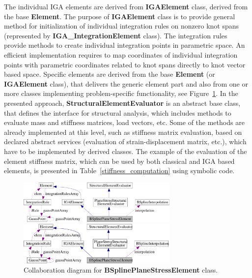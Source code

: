 \documentclass[a4paper]{article}
\newcommand{\class}[1]{{\bf #1}}
\begin{document}
The individual IGA elements are derived from \class{IGAElement} class,
derived from the base \class{Element}. The purpose of \class{IGAElement}
class is to provide general method for initialization of individual
integration rules on nonzero knot spans (represented by
\class{IGA\_IntegrationElement} class). The integration rules provide
methods to create individual integration points in parametric
space. An efficient implementation requires to map coordinates of
individual integration points with parametric coordinates related to
knot spans directly to knot vector based space. Specific elements are
derived from the base \class{Element} (or  \class{IGAElement} class), that
delivers the generic element part and also from one or more classes
implementing problem-specific functionality, see
Figure~\ref{BSplinePlaneStressElement}. In the presented approach,
\class{StructuralElementEvaluator} is an abstract base class, that
defines the interface for structural analysis, which includes methods
to evaluate mass and stiffness matrices, load vectors, etc. Some of
the methods are already implemented at this level, such as stiffness
matrix evaluation, based on declared abstract services (evaluation of
strain-displacement matrix, etc.), which have to be implemented by
derived classes. The example of the evaluation of the element stiffness matrix,
which can be used by both classical and IGA based elements, is
presented in Table~\ref{stiffness_computation} using symbolic
code.

\begin{figure}[b!]
\begin{center}
\ifpdf
\centerline{\includegraphics[width=0.7\textwidth]{class_BsplinePlaneStressElement_collaboration.pdf}}
\else
\centerline{\includegraphics[width=0.7\textwidth]{class_BsplinePlaneStressElement_collaboration.eps}}
\fi
\caption{Collaboration diagram for \class{BSplinePlaneStressElement} class.}
\label{BSplinePlaneStressElement}
\end{center}
\vspace{-5mm}
\end{figure}
\end{document}
